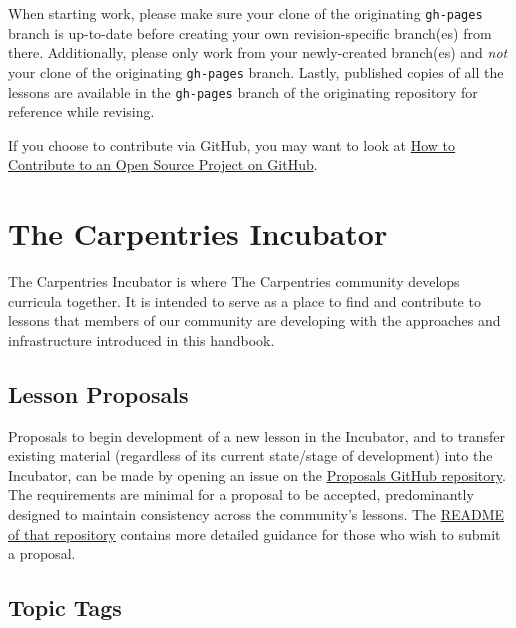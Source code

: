 \documentclass[
]{book}
\begin{document}
When starting work, please make sure your clone of the originating \texttt{gh-pages} branch is up-to-date
before creating your own revision-specific branch(es) from there.
Additionally, please only work from your newly-created branch(es) and \emph{not}
your clone of the originating \texttt{gh-pages} branch.
Lastly, published copies of all the lessons are available in the \texttt{gh-pages} branch of the originating
repository for reference while revising.

If you choose to contribute via GitHub, you may want to look at
\href{https://egghead.io/series/how-to-contribute-to-an-open-source-project-on-github}{How to Contribute to an Open Source Project on GitHub}.

\hypertarget{appendix-appendix}{%
\appendix}


\hypertarget{the-carpentries-incubator}{%
\chapter{The Carpentries Incubator}\label{the-carpentries-incubator}}

The Carpentries Incubator is where The Carpentries community develops
curricula together.
It is intended to serve as a place to find and contribute to lessons
that members of our community are developing with the approaches
and infrastructure introduced in this handbook.

\hypertarget{lesson-proposals}{%
\section{Lesson Proposals}\label{lesson-proposals}}

Proposals to begin development of a new lesson in the Incubator,
and to transfer existing material
(regardless of its current state/stage of development) into the Incubator,
can be made by opening an issue on the \href{https://github.com/carpentries-incubator/proposals/}{Proposals GitHub repository}.
The requirements are minimal for a proposal to be accepted,
predominantly designed to maintain consistency across the community's lessons.
The \href{https://github.com/carpentries-incubator/proposals/blob/master/README.md}{README of that repository} contains
more detailed guidance for those who wish to submit a proposal.

\hypertarget{topic-tags}{%
\section{Topic Tags}\label{topic-tags}}
\end{document}
